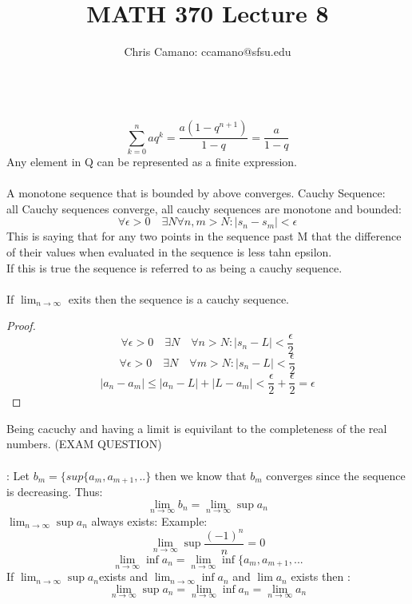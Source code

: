\documentclass[11pt]{article}
\author{Chris Camano: ccamano@sfsu.edu}
\title{MATH 370  Lecture 8 }
\date
\theoremstyle{definition}
\begin{document}
\maketitle
\newcommand{\nlim}{\lim_{n\rightarrow\infty}}
\\
\[
  \sum_{k=0}^n aq^k=\frac{a(1-q^{n+1})}{1-q}=\frac{a}{1-q}
\]
Any element in Q can be represented as a finite expression.\\\\
A monotone sequence that is bounded by above converges.
 Cauchy Sequence: \\
all Cauchy sequences converge, all cauchy sequences are monotone and bounded:
\[
  \forall \epsilon>0\quad \exists N\forall  n,m>N: |s_n-s_m|<\epsilon
\]
This is saying that for any two points in the sequence past M that the difference of their values when evaluated in the sequence is less tahn epsilon. \\
If this is true the sequence is referred to as being a cauchy sequence. \\\\
If $\nlim$ exits then the sequence is a cauchy sequence.
\begin{proof}
  \[
    \forall \epsilon>0\quad \exists N\quad \forall  n>N: |s_n-L|<\frac{\epsilon}{2}
  \]
  \[
    \forall \epsilon>0\quad \exists N\quad \forall  m>N: |s_n-L|<\frac{\epsilon}{2}
  \]
  \[
    |a_n-a_m|\leq|a_n-L|+|L-a_m|<\frac{\epsilon}{2}+\frac{\epsilon}{2}=\epsilon
  \]
\end{proof}
Being cacuchy and having a limit is equivilant to the completeness of the real numbers. (EXAM QUESTION)\\\\
:
Let $b_m=\{sup\{a_m,a_{m+1},..\}$ then we know that $b_m$ converges since the sequence is decreasing. Thus:
\[
  \nlim b_n=\nlim \sup a_n
\]
$\nlim \sup a_n$ always exists:
Example:
\[
  \nlim \sup \frac{(-1)^n}{n}=0
\]
\[
  \nlim \inf a_n=\nlim \inf \{a_m,a_{m+1},...
\]
\theorem If $\nlim\sup a_n$exists and $\nlim\inf a_n$ and $\lim a_n$ exists then :
\[
  \nlim\sup a_n=\nlim\inf a_n=\nlim a_n
\]
\end{document}
